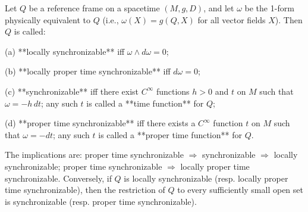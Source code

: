 Let $Q$ be a reference frame on a spacetime $(M, g, D)$, and let $\omega$ be the 1-form physically equivalent to $Q$ (i.e., $\omega(X) = g(Q, X)$ for all vector fields $X$). Then $Q$ is called:

(a) **locally synchronizable** iff $\omega \wedge d\omega = 0$;

(b) **locally proper time synchronizable** iff $d\omega = 0$;

(c) **synchronizable** iff there exist $C^\infty$ functions $h > 0$ and $t$ on $M$ such that $\omega = -h \, dt$; any such $t$ is called a **time function** for $Q$;

(d) **proper time synchronizable** iff there exists a $C^\infty$ function $t$ on $M$ such that $\omega = -dt$; any such $t$ is called a **proper time function** for $Q$.

The implications are: proper time synchronizable $\Rightarrow$ synchronizable $\Rightarrow$ locally synchronizable; proper time synchronizable $\Rightarrow$ locally proper time synchronizable. Conversely, if $Q$ is locally synchronizable (resp. locally proper time synchronizable), then the restriction of $Q$ to every sufficiently small open set is synchronizable (resp. proper time synchronizable).
